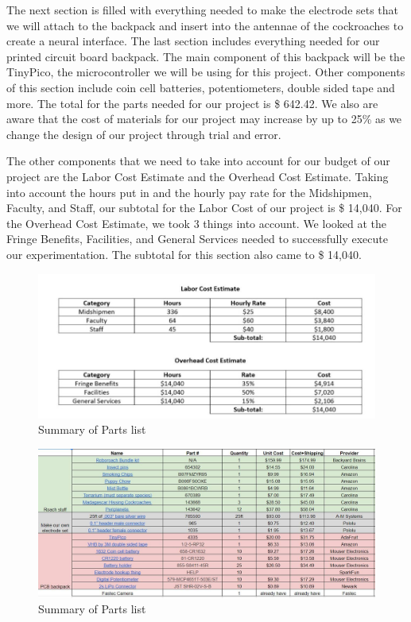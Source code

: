 \documentclass{article}
\begin{document}
\bigskip

\par The next section is filled with everything needed to make the electrode sets that we will attach to the backpack and insert into the antennae of the cockroaches to create a neural interface. The last section includes everything needed for our printed circuit board backpack. The main component of this backpack will be the TinyPico, the microcontroller we will be using for this project. Other components of this section include coin cell batteries, potentiometers, double sided tape and more. The total for the parts needed for our project is \$ 642.42. We also are aware that the  cost of materials for our project may increase by up to 25\% as we change the design of our project through trial and error.

\bigskip

\par The other components that we need to take into account for our budget of our project are the Labor Cost Estimate and the Overhead Cost Estimate.  Taking into account the hours put in and the hourly pay rate for the Midshipmen, Faculty, and Staff, our subtotal for the Labor Cost of our project is \$ 14,040. For the Overhead Cost Estimate, we took 3 things into account. We looked at the Fringe Benefits, Facilities, and General Services needed to successfully execute our experimentation. The subtotal for this section also came to \$ 14,040.

\begin{figure}
\centering
\includegraphics[scale=0.65]{budget.JPG}
\caption{Summary of Parts list}
\label{fig:budget}
\end{figure}

\begin{figure}
\includegraphics[scale=0.50]{partlist.JPG}
\caption{Summary of Parts list}
\label{fig:partlist}
\end{figure}
\end{document}
